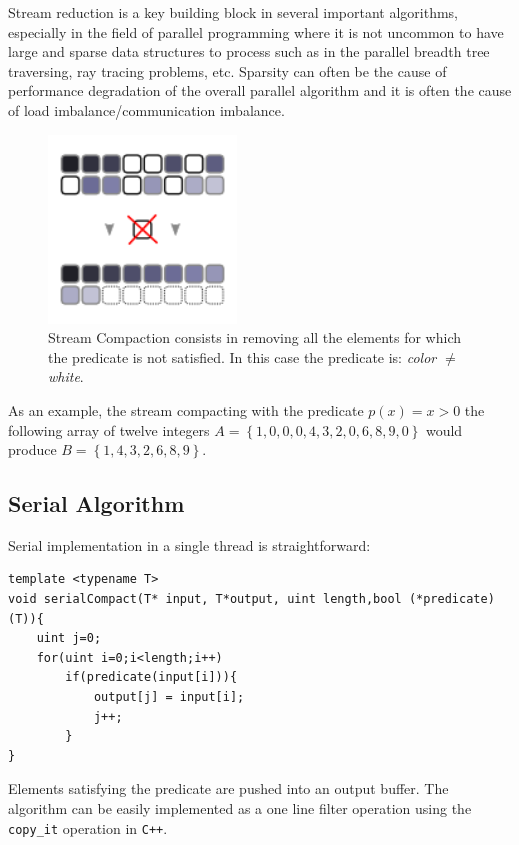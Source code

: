 Stream reduction is a key building block in several important algorithms, especially in the field of parallel programming where it is not uncommon to have large and sparse data structures to process such as in the parallel breadth tree traversing, ray tracing problems, etc. Sparsity can often be the cause of performance degradation of the overall parallel algorithm and it is often the cause of load imbalance/communication imbalance.
\begin{figure}
	\begin{center}
		\includegraphics[width=5cm]{./images/stream_compaction/stream_compaction}
		\caption[Stream Compaction schematization.]{Stream Compaction consists in removing all the elements for which the predicate is not satisfied. In this case the predicate is: \textit{color $\ne$ white}.}
		\label{fig:stream_compaction}
	\end{center}
\end{figure}
As an example, the stream  compacting with the predicate \(p(x) = x >0 \) the following  array of twelve integers \(A=\left\{1,0,0,0,4,3,2,0,6,8,9,0\right\}\) would produce \(B=\left\{1,4,3,2,6,8,9\right\}\).

\subsection{Serial Algorithm}
Serial implementation in a single thread is straightforward:
\begin{lstlisting}
template <typename T>
void serialCompact(T* input, T*output, uint length,bool (*predicate)(T)){
	uint j=0;
	for(uint i=0;i<length;i++)
		if(predicate(input[i])){
			output[j] = input[i];
			j++;
		}
}	
\end{lstlisting}
Elements satisfying the predicate are pushed into an output buffer. The algorithm can be easily implemented as a one line filter operation using the \texttt{copy\_it} operation in \texttt{C++}.

